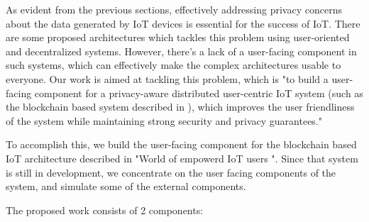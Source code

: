 As evident from the previous sections, effectively addressing privacy concerns about the data generated by IoT devices is essential for the success of IoT. There are some proposed architectures which tackles this problem using user-oriented and decentralized systems. However, there's a lack of a user-facing component in such systems, which can effectively make the complex architectures usable to everyone. Our work is aimed at tackling this problem, which is "to build a user-facing component for a privacy-aware distributed user-centric IoT system (such as the blockchain based system described in \cite{campbell}), which improves the user friendliness of the system while maintaining strong security and privacy guarantees."

To accomplish this, we build the user-facing component for the blockchain based IoT architecture described in "World of empowerd IoT users \cite{campbell}". Since that system is still in development, we concentrate on the user facing components of the system, and simulate some of the external components.

The proposed work consists of 2 components:

